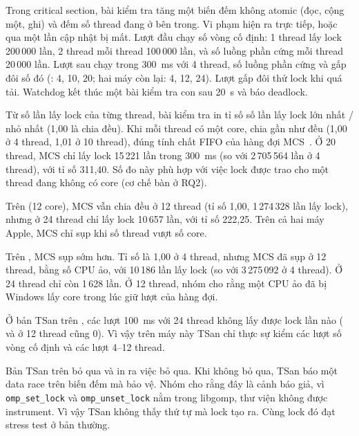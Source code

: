 \label{sec:corr:lock}

Trong critical section, bài kiểm tra tăng một biến đếm không atomic (đọc, cộng một, ghi) và đếm số
thread đang ở bên trong. Vi phạm hiện ra trực tiếp, hoặc qua một lần cập nhật bị mất. Lượt đầu chạy
số vòng cố định: 1 thread lấy lock 200\,000 lần, 2 thread mỗi thread 100\,000 lần, và số luồng phần cứng
mỗi thread 20\,000 lần. Lượt sau chạy trong 300~ms với 4 thread, số luồng phần cứng và gấp đôi số đó
(: 4, 10, 20; hai máy còn lại: 4, 12, 24). Lượt gấp đôi thử lock khi quá tải. Watchdog
kết thúc một bài kiểm tra con sau 20~s và báo deadlock.

Từ số lần lấy lock của từng thread, bài kiểm tra in tỉ số số lần lấy lock lớn nhất / nhỏ nhất (1,00 là
chia đều). Khi mỗi thread có một core,  chia gần như đều (1,00 ở 4 thread, 1,01 ở 10 thread),
đúng tính chất FIFO của hàng đợi MCS~\cite{mellorcrummey1991mcs}. Ở 20 thread, MCS chỉ lấy lock 15\,221
lần trong 300~ms (so với 2\,705\,564 lần ở 4 thread), với tỉ số 311,40. Số đo này phù hợp với việc lock
được trao cho một thread đang không có core (cơ chế bàn ở RQ2).

Trên  (12 core), MCS vẫn chia đều ở 12 thread (tỉ số 1,00, 1\,274\,328 lần lấy lock),
nhưng ở 24 thread chỉ lấy lock 10\,657 lần, với tỉ số 222,25. Trên cả hai máy Apple, MCS chỉ sụp khi số
thread vượt số core.

Trên , MCS sụp sớm hơn. Tỉ số là 1,00 ở 4 thread, nhưng MCS đã sụp ở 12 thread, bằng số
CPU ảo, với 10\,186 lần lấy lock (so với 3\,275\,092 ở 4 thread). Ở 24 thread chỉ còn 1\,628 lần. Ở
12 thread, nhóm cho rằng một CPU ảo đã bị Windows lấy core trong lúc giữ lượt của hàng đợi.

Ở bản TSan trên , các lượt 100~ms với 24 thread không lấy được lock lần nào (
và  ở 12 thread cũng 0). Vì vậy trên máy này TSan chỉ thực sự kiểm các lượt số vòng
cố định và các lượt 4--12 thread.

Bản TSan trên  bỏ qua  và in ra việc bỏ qua. Khi không bỏ qua, TSan
báo một data race trên biến đếm mà  bảo vệ. Nhóm cho rằng đây là cảnh báo giả, vì
\texttt{omp\_set\_lock} và \texttt{omp\_unset\_lock} nằm trong libgomp, thư viện không được
instrument. Vì vậy TSan không thấy thứ tự mà lock tạo ra. Cùng lock đó đạt stress test ở bản thường.
